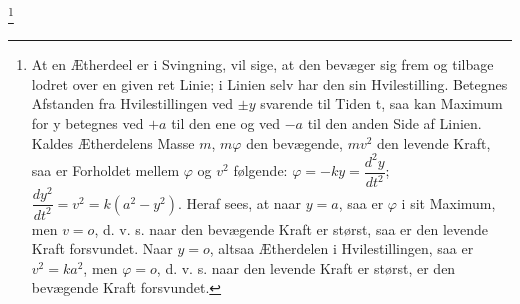 \documentclass[12pt,a4paper]{book}
\renewcommand{\thefootnote}{*)}
\begin{document}
\renewcommand{\thefootnote}{**)}%
\footnote{%
At en Ætherdeel er i Svingning, vil sige, at den bevæger sig frem og
tilbage lodret over en given ret Linie; i Linien selv har den sin
Hvilestilling. Betegnes Afstanden fra Hvilestillingen ved $\pm y$
svarende til Tiden t, saa kan Maximum for y betegnes ved $+a$ til den
ene og ved $-a$ til den anden Side af Linien. Kaldes Ætherdelens Masse
$m$, $m\varphi$ den bevægende, $mv^{2}$ den levende Kraft, saa er
Forholdet mellem $\varphi$ og $v^{2}$ følgende:
$\varphi = -ky = \dfrac{d^{2}y}{dt^{2}}$;
$\dfrac{dy^{2}}{dt^{2}} = v^{2} = k(a^{2}-y^{2})$.
Heraf sees, at naar $y = a$, saa er $\varphi$ i sit Maximum, men
$v = o$, d. v. s. naar den bevægende Kraft er størst, saa er den
levende Kraft forsvundet. Naar $y = o$, altsaa Ætherdelen i
Hvilestillingen, saa er $v^{2} = ka^{2}$, men $\varphi = o$, d. v. s.
naar den levende Kraft er størst, er den bevægende Kraft forsvundet.}%
\renewcommand{\thefootnote}{*)}
\end{document}
